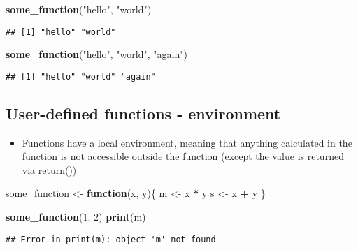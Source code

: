 \documentclass[]{article}
\newenvironment{Shaded}{\begin{snugshade}}{\end{snugshade}}
\newcommand{\KeywordTok}[1]{\textcolor[rgb]{0.13,0.29,0.53}{\textbf{#1}}}
\newcommand{\DecValTok}[1]{\textcolor[rgb]{0.00,0.00,0.81}{#1}}
\newcommand{\StringTok}[1]{\textcolor[rgb]{0.31,0.60,0.02}{#1}}
\newcommand{\ControlFlowTok}[1]{\textcolor[rgb]{0.13,0.29,0.53}{\textbf{#1}}}
\newcommand{\OperatorTok}[1]{\textcolor[rgb]{0.81,0.36,0.00}{\textbf{#1}}}
\newcommand{\NormalTok}[1]{#1}
\providecommand{\tightlist}{%
  \setlength{\itemsep}{0pt}\setlength{\parskip}{0pt}}
\begin{document}
\begin{Shaded}
\begin{Highlighting}[]
\KeywordTok{some_function}\NormalTok{(}\StringTok{"hello"}\NormalTok{, }\StringTok{"world"}\NormalTok{)}
\end{Highlighting}
\end{Shaded}

\begin{verbatim}
## [1] "hello" "world"
\end{verbatim}

\begin{Shaded}
\begin{Highlighting}[]
\KeywordTok{some_function}\NormalTok{(}\StringTok{"hello"}\NormalTok{, }\StringTok{"world"}\NormalTok{, }\StringTok{"again"}\NormalTok{)}
\end{Highlighting}
\end{Shaded}

\begin{verbatim}
## [1] "hello" "world" "again"
\end{verbatim}

\subsection{User-defined functions -
environment}\label{user-defined-functions---environment}

\begin{itemize}
\tightlist
\item
  Functions have a local environment, meaning that anything calculated
  in the function is not accessible outside the function (except the
  value is returned via return())
\end{itemize}

\begin{Shaded}
\begin{Highlighting}[]
\NormalTok{some_function <-}\StringTok{ }\ControlFlowTok{function}\NormalTok{(x, y)\{}
\NormalTok{  m <-}\StringTok{ }\NormalTok{x }\OperatorTok{*}\StringTok{ }\NormalTok{y}
\NormalTok{  s <-}\StringTok{ }\NormalTok{x }\OperatorTok{+}\StringTok{ }\NormalTok{y}
\NormalTok{\}}

\KeywordTok{some_function}\NormalTok{(}\DecValTok{1}\NormalTok{, }\DecValTok{2}\NormalTok{)}
\KeywordTok{print}\NormalTok{(m)}
\end{Highlighting}
\end{Shaded}

\begin{verbatim}
## Error in print(m): object 'm' not found
\end{verbatim}
\end{document}
